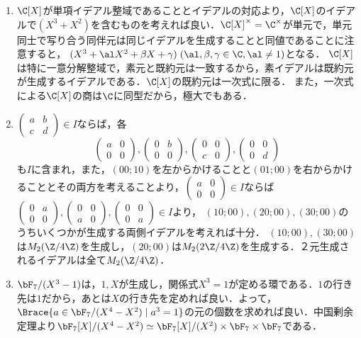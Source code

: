 \documentclass[uplatex,dvipdfmx]{jsreport}
\begin{document}
\begin{enumerate}
    \item 
    $\C[X]$が単項イデアル整域であることとイデアルの対応より，$\C[X]$のイデアルで$(X^3+X^2)$を含むものを考えれば良い．$\C[X]^\times=\C^\times$が単元で，単元同士で写り合う同伴元は同じイデアルを生成することと同値であることに注意すると，
    $(X^3+\al X^2+\beta X+\gamma)\;(\al,\beta,\gamma\in\C, \al\ne 1)$となる．
    $\C[X]$は特に一意分解整域で，素元と既約元は一致するから，素イデアルは既約元が生成するイデアルである．$\C[X]$の既約元は一次式に限る．
    また，一次式による$\C[X]$の商は$\C$に同型だから，極大でもある．
    \item 
    $\begin{pmatrix}a&b\\c&d\end{pmatrix}\in I$ならば，各
    \[\begin{pmatrix}a&0\\0&0\end{pmatrix},\begin{pmatrix}0&b\\0&0\end{pmatrix},\begin{pmatrix}0&0\\c&0\end{pmatrix},\begin{pmatrix}0&0\\0&d\end{pmatrix}\]
    も$I$に含まれ，また，$(00;10)$を左からかけることと$(01;00)$を右からかけることとその両方を考えることより，$\begin{pmatrix}a&0\\0&0\end{pmatrix}\in I$ならば$\begin{pmatrix}0&a\\0&0\end{pmatrix},\begin{pmatrix}0&0\\a&0\end{pmatrix},\begin{pmatrix}0&0\\0&a\end{pmatrix}\in I$より，
    $(10;00),(20;00),(30;00)$のうちいくつかが生成する両側イデアルを考えれば十分．
    $(10;00),(30;00)$は$M_2(\Z/4\Z)$を生成し，$(20;00)$は$M_2(2\Z/4\Z)$を生成する．２元生成されるイデアルは全て$M_2(\Z/4\Z)$．
    \item $\bF_7/(X^3-1)$は，$1,X$が生成し，関係式$X^3=1$が定める環である．$1$の行き先は$1$だから，あとは$X$の行き先を定めれば良い．よって，$\Brace{a\in\bF_7/(X^4-X^2)\mid a^3=1}$の元の個数を求めれば良い．中国剰余定理より$\bF_7[X]/(X^4-X^2)\simeq\bF_7[X]/(X^2)\times\bF_7\times\bF_7$である．

\end{enumerate}
\end{document}
